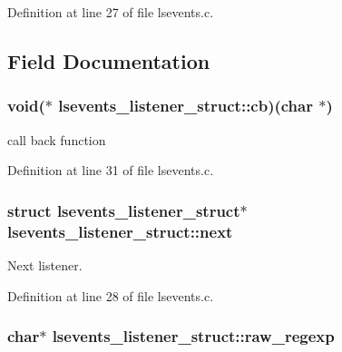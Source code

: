 Definition at line 27 of file lsevents.\-c.



\subsection{Field Documentation}
\hypertarget{structlsevents__listener__struct_a005906c1c9f0647e6ed1fb4592d8c5d0}{
\subsubsection[{cb}]{\setlength{\rightskip}{0pt plus 5cm}void($\ast$ lsevents\-\_\-listener\-\_\-struct\-::cb)(char $\ast$)}}\label{structlsevents__listener__struct_a005906c1c9f0647e6ed1fb4592d8c5d0}


call back function 



Definition at line 31 of file lsevents.\-c.

\hypertarget{structlsevents__listener__struct_a8aed9196b0deab84e018b96c0cc59305}{
\subsubsection[{next}]{\setlength{\rightskip}{0pt plus 5cm}struct {\bf lsevents\-\_\-listener\-\_\-struct}$\ast$ lsevents\-\_\-listener\-\_\-struct\-::next}}\label{structlsevents__listener__struct_a8aed9196b0deab84e018b96c0cc59305}


Next listener. 



Definition at line 28 of file lsevents.\-c.

\hypertarget{structlsevents__listener__struct_afffe7a6889fda47a3a7a91beefed9168}{
\subsubsection[{raw\-\_\-regexp}]{\setlength{\rightskip}{0pt plus 5cm}char$\ast$ lsevents\-\_\-listener\-\_\-struct\-::raw\-\_\-regexp}}\label{structlsevents__listener__struct_afffe7a6889fda47a3a7a91beefed9168}


